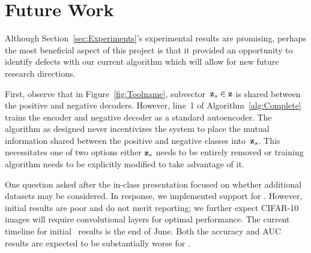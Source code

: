 \section{Future Work}\label{sec:FutureWork}

Although Section~\ref{sec:Experiments}'s experimental results are promising, perhaps the most beneficial aspect of this project is that it provided an opportunity to identify defects with our current algorithm which will allow for new future research directions.

First, observe that in Figure~\ref{fig:Toolname}, subvector~${\mathbf{z}_{s}\in\mathbf{z}}$ is shared between the positive and negative decoders.  However, line~1 of Algorithm~\ref{alg:Complete} trains the encoder and negative decoder as a standard autoencoder.  The algorithm as designed never incentivizes the system to place the mutual information shared between the positive and negative classes into~$\mathbf{z}_{s}$.  This necessitates one of two options either $\mathbf{z}_{s}$ needs to be entirely removed or training algorithm needs to be explicitly modified to take advantage of it.

One question asked after the in-class presentation focused on whether additional datasets may be considered.  In response, we implemented support for \CIFARten.  However, initial results are poor and do not merit reporting; we further expect CIFAR-10 images will require convolutional layers for optimal performance.  The current timeline for initial \CIFARten\ results is the end of June.  Both the accuracy and AUC results are expected to be substantially worse for \CIFARten.
